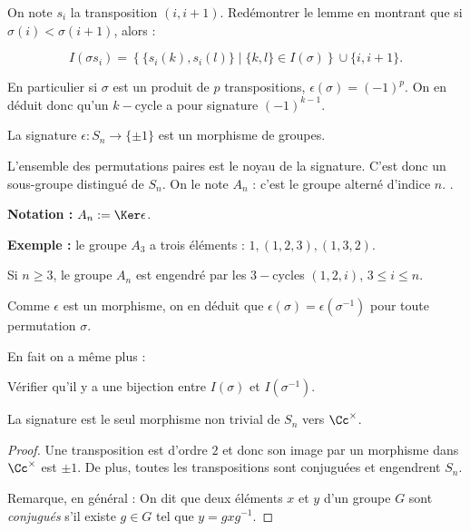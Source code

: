 \documentclass[class=report,crop=false]{standalone}
\begin{document}
\begin{exercicecours}
On note $s_i$ la transposition $(i,i+1)$. Redémontrer le lemme en montrant que si $\sigma(i) < \sigma(i+1)$, alors :

\[I(\sigma s_i) = \left\{\{s_i(k),s_i(l)\} \mid \{k,l\} \in I(\sigma) \right\} \cup \{i,i+1\} .\]
\end{exercicecours}

En particulier si $\sigma$ est un produit de $p$ transpositions, $\epsilon(\sigma) = (-1)^p$. On en déduit donc qu'un $k-$cycle a pour signature $(-1)^{k-1}$.


\begin{proposition}
La signature  $\epsilon : S_n \to \{\pm 1\}$ est un morphisme de groupes.
\end{proposition}




\begin{definition}
L'ensemble des permutations paires est le noyau de la signature. C'est donc un sous-groupe distingué de $S_n$. On le note $A_n$ : c'est le groupe alterné d'indice $n$. .
\end{definition}

{\bf Notation :} $A_n :=\Ker \epsilon$.

{\bf Exemple :} le groupe $A_3$ a trois éléments : $1,(1,2,3), (1,3,2)$.


\begin{exercicecours}
Si $n \ge 3$, le groupe $A_n$ est engendré par les $3-$cycles $(1,2,i)$, $3 \le i \le n$.
\end{exercicecours}

Comme $\epsilon$ est un morphisme, on en déduit que $\epsilon(\sigma) = \epsilon(\sigma^{-1})$ pour toute permutation $\sigma$.

En fait on a même plus :
\begin{exercicecours}
Vérifier qu'il y a une bijection entre $I(\sigma)$ et $I(\sigma^{-1})$. 
\end{exercicecours}

\begin{proposition}
La signature est le seul morphisme non trivial de $S_n$ vers $\Cc^\times$.
\end{proposition}

\begin{proof}
Une transposition est d'ordre $2$ et donc son image par un morphisme dans $\Cc^\times$ est $\pm 1$. De plus, toutes les transpositions sont conjuguées et engendrent $S_n$.

Remarque, en général : On dit que deux éléments $x$ et $y$ d'un groupe $G$ sont {\it conjugués}  s'il existe $g \in G$ tel que $y = gxg^{-1}$.

\end{proof}
\end{document}
